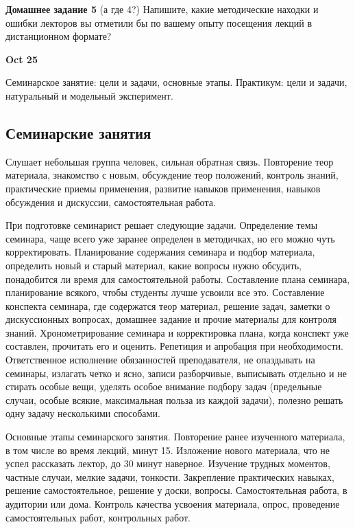 \documentclass[a4paper, 12pt]{article}
\begin{document}
\textbf{Домашнее задание 5} (а где 4?) Напишите, какие методические 
находки и ошибки лекторов вы отметили бы по вашему опыту посещения 
лекций в дистанционном формате?


\hfill\textbf{Oct 25}

Семинарское занятие: цели и задачи, основные этапы. Практикум: цели 
и задачи, натуральный и модельный эксперимент.

\subsection{Семинарские занятия}

Слушает небольшая группа человек, сильная обратная связь. Повторение 
теор материала, знакомство с новым, обсуждение теор положений, контроль 
знаний, практические приемы применения, развитие навыков применения, 
навыков обсуждения и дискуссии, самостоятельная работа.

При подготовке семинарист решает следующие задачи. Определение темы 
семинара, чаще всего уже заранее определен в методичках, но его можно 
чуть корректировать. Планирование содержания семинара и подбор 
материала, определить новый и старый материал, какие вопросы нужно 
обсудить, понадобится ли время для самостоятельной работы. Составление 
плана семинара, планирование всякого, чтобы студенты лучше усвоили все 
это. Составление конспекта семинара, где содержатся теор материал, 
решение задач, заметки о дискуссионных вопросах, домашнее задание 
и прочие материалы для контроля знаний. Хронометрирование семинара 
и корректировка плана, когда конспект уже составлен, прочитать его 
и оценить. Репетиция и апробация при необходимости. Ответственное 
исполнение обязанностей преподавателя, не опаздывать на семинары, 
излагать четко и ясно, записи разборчивые, выписывать отдельно и не 
стирать особые вещи, уделять особое внимание подбору задач (предельные 
случаи, особые всякие, максимальная польза из каждой задачи), полезно 
решать одну задачу несколькими способами.

Основные этапы семинарского занятия. Повторение ранее изученного 
материала, в том числе во время лекций, минут 15. Изложение нового 
материала, что не успел рассказать лектор, до 30 минут наверное. 
Изучение трудных моментов, частные случаи, мелкие задачи, тонкости. 
Закрепление практических навыках, решение самостоятельное, решение 
у доски, вопросы. Самостоятельная работа, в аудитории или дома. Контроль 
качества усвоения материала, опрос, проведение самостоятельных работ, 
контрольных работ.
\end{document}
